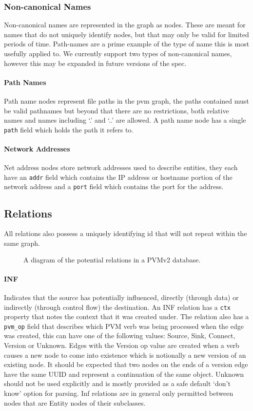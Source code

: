 \documentclass[12pt,twoside,a4paper]{article}
\newcommand{\field}[1]{\texttt{#1}}
\newcommand{\para}[1]{\paragraph{#1\\}}
\begin{document}
\subsubsection{Non-canonical Names}
\label{sec:gs:node:name}
Non-canonical names are represented in the graph as nodes. These are meant for names that do not uniquely identify nodes, but that may only be valid for limited periods of time. Path-names are a prime example of the type of name this is most usefully applied to. We currently support two types of non-canonical names, however this may be expanded in future versions of the spec.

\para{Path Names}
\label{sec:gs:node:name:path}
Path name nodes represent file paths in the pvm graph, the paths contained must be valid pathnames but beyond that there are no restrictions, both relative names and names including `.' and `..' are allowed. A path name node has a single \field{path} field which holds the path it refers to.

\para{Network Addresses}
\label{sec:gs:node:name:net}
Net address nodes store network addresses used to describe entities, they each have an \field{addr} field which contains the IP address or hostname portion of the network address and a \field{port} field which contains the port for the address.

\subsection{Relations}
\label{sec:gs:rel}
All relations also possess a uniquely identifying id that will not repeat within the same graph.

\begin{figure}[h]
\centering

\caption{A diagram of the potential relations in a PVMv2 database.}
\label{fig:rels}
\end{figure}

\para{INF}
\label{sec:gs:rel:inf}
Indicates that the source has potentially influenced, directly (through data) or indirectly (through control flow) the destination. An INF relation has a \field{ctx} property that notes the context that it was created under. The relation also has a \field{pvm\_op} field that describes which PVM verb was being processed when the edge was created, this can have one of the following values: Source, Sink, Connect, Version or Unknown. Edges with the Version op value are created when a verb causes a new node to come into existence which is notionally a new version of an existing node. It should be expected that two nodes on the ends of a version edge have the same UUID and represent a continuation of the same object. Unknown should not be used explicitly and is mostly provided as a safe default `don't know' option for parsing. Inf relations are in general only permitted between nodes that are Entity nodes of their subclasses. %
\end{document}
